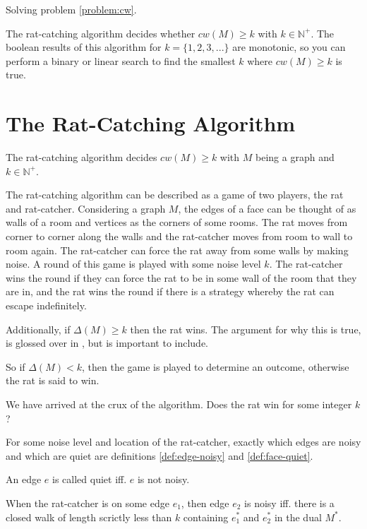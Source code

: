 \documentclass{article}
\begin{document}
			Solving problem \ref{problem:cw}.

			The rat-catching algorithm decides whether $cw(M) \geq k$ with $k \in \mathbb{N}^+$. The boolean results of this algorithm for $k=\{1,2,3,...\}$ are monotonic, so you can perform a binary or linear search to find the smallest $k$ where $cw(M) \geq k$ is true.


	\section{The Rat-Catching Algorithm}

		The rat-catching algorithm decides $cw(M) \geq k$ with $M$ being a graph and $k \in \mathbb{N}^+$.

		The rat-catching algorithm can be described as a game of two players, the rat and rat-catcher. Considering a graph $M$, the edges of a face can be thought of as walls of a room and vertices as the corners of some rooms. The rat moves from corner to corner along the walls and the rat-catcher moves from room to wall to room again. The rat-catcher can force the rat away from some walls by making noise. A round of this game is played with some noise level $k$. The rat-catcher wins the round if they can force the rat to be in some wall of the room that they are in, and the rat wins the round if there is a strategy whereby the rat can escape indefinitely.

		Additionally, if $\Delta(M) \geq k$ then the rat wins. The argument for why this is true, is glossed over in \cite{BGZ15}, but is important to include.

		So if $\Delta(M) < k$, then the game is played to determine an outcome, otherwise the rat is said to win.

		We have arrived at the crux of the algorithm. Does the rat win for some integer $k$?

		For some noise level and location of the rat-catcher, exactly which edges are noisy and which are quiet are definitions \ref{def:edge-noisy} and \ref{def:face-quiet}.

		An edge $e$ is called quiet iff. $e$ is not noisy.

		\begin{definition}\label{def:edge-noisy}
			When the rat-catcher is on some edge $e_1$, then edge $e_2$ is noisy iff. there is a closed walk of length scrictly less than $k$ containing $e_1^*$ and $e_2^*$ in the dual $M^*$.
		\end{definition}
\end{document}
